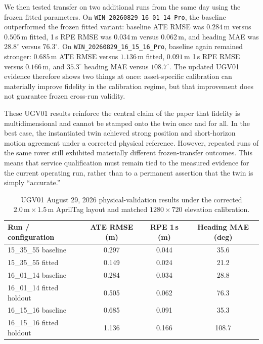 We then tested transfer on two additional runs from the same day using the
frozen fitted parameters. On \texttt{WIN\_20260829\_16\_01\_14\_Pro}, the
baseline outperformed the frozen fitted variant: baseline ATE RMSE was
$0.284\,\mathrm{m}$ versus $0.505\,\mathrm{m}$ fitted, 1\,s RPE RMSE was
$0.034\,\mathrm{m}$ versus $0.062\,\mathrm{m}$, and heading MAE was
$28.8^\circ$ versus $76.3^\circ$. On \texttt{WIN\_20260829\_16\_15\_16\_Pro},
baseline again remained stronger: $0.685\,\mathrm{m}$ ATE RMSE versus
$1.136\,\mathrm{m}$ fitted, $0.091\,\mathrm{m}$ 1\,s RPE RMSE versus
$0.166\,\mathrm{m}$, and $35.3^\circ$ heading MAE versus $108.7^\circ$. The
updated UGV01 evidence therefore shows two things at once: asset-specific
calibration can materially improve fidelity in the calibration regime, but
that improvement does not guarantee frozen cross-run validity.

These UGV01 results reinforce the central claim of the paper that fidelity is
multidimensional and cannot be stamped onto the twin once and for all. In the
best case, the instantiated twin achieved strong position and short-horizon
motion agreement under a corrected physical reference. However, repeated runs of
the same rover still exhibited materially different frozen-transfer outcomes.
This means that service qualification must remain tied to the measured evidence
for the current operating run, rather than to a permanent assertion that the
twin is simply ``accurate.''

\begin{table}[t]
\centering
\caption{UGV01 August 29, 2026 physical-validation results under the corrected
$2.0\,\mathrm{m}\times1.5\,\mathrm{m}$ AprilTag layout and matched
$1280\times720$ elevation calibration.}
\label{tab:ugv01_aug29_results}
\begin{tabular}{lccc}
\toprule
Run / configuration & ATE RMSE (m) & RPE 1\,s (m) & Heading MAE (deg) \\
\midrule
15\_35\_55 baseline & 0.297 & 0.044 & 35.6 \\
15\_35\_55 fitted   & 0.149 & 0.024 & 21.2 \\
16\_01\_14 baseline & 0.284 & 0.034 & 28.8 \\
16\_01\_14 fitted holdout & 0.505 & 0.062 & 76.3 \\
16\_15\_16 baseline & 0.685 & 0.091 & 35.3 \\
16\_15\_16 fitted holdout & 1.136 & 0.166 & 108.7 \\
\bottomrule
\end{tabular}
\end{table}

